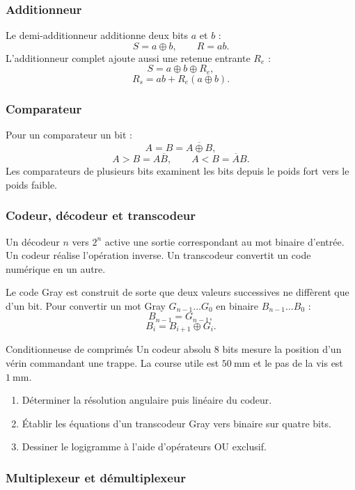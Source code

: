 \subsubsection{Additionneur}

Le demi-additionneur additionne deux bits $a$ et $b$ :
\[
\boxed{S=a\oplus b,}
\qquad
\boxed{R=ab.}
\]
L'additionneur complet ajoute aussi une retenue entrante $R_e$ :
\[
S=a\oplus b\oplus R_e,
\]
\[
R_s=ab+R_e(a\oplus b).
\]

\subsubsection{Comparateur}

Pour un comparateur un bit :
\[
A=B=\overline{A\oplus B},
\]
\[
A>B=A\overline B,
\qquad
A<B=\overline A B.
\]
Les comparateurs de plusieurs bits examinent les bits depuis le poids fort vers le poids faible.

\subsubsection{Codeur, décodeur et transcodeur}

Un décodeur $n$ vers $2^n$ active une sortie correspondant au mot binaire d'entrée. Un codeur réalise l'opération inverse. Un transcodeur convertit un code numérique en un autre.

Le code Gray est construit de sorte que deux valeurs successives ne diffèrent que d'un bit. Pour convertir un mot Gray $G_{n-1}\ldots G_0$ en binaire $B_{n-1}\ldots B_0$ :
\[
\boxed{B_{n-1}=G_{n-1},}
\]
\[
\boxed{B_i=B_{i+1}\oplus G_i.}
\]

\begin{TLLogicApplication}{Conditionneuse de comprimés}
Un codeur absolu 8 bits mesure la position d'un vérin commandant une trappe. La course utile est $50\ \mathrm{mm}$ et le pas de la vis est $1\ \mathrm{mm}$.
\begin{enumerate}
  \item Déterminer la résolution angulaire puis linéaire du codeur.
  \item Établir les équations d'un transcodeur Gray vers binaire sur quatre bits.
  \item Dessiner le logigramme à l'aide d'opérateurs OU exclusif.
\end{enumerate}
\end{TLLogicApplication}

\subsubsection{Multiplexeur et démultiplexeur}

